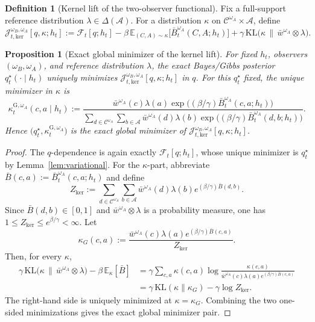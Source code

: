 \documentclass[11pt]{article}
\newtheorem{proposition}[theorem]{Proposition}
\theoremstyle{definition}
\newtheorem{definition}[theorem]{Definition}
\theoremstyle{remark}
\newcommand{\Acal}{\mathcal{A}}
\newcommand{\Ccal}{\mathcal{C}}
\newcommand{\E}{\mathbb{E}}
\newcommand{\KL}{\mathrm{KL}}
\begin{document}
\begin{definition}[Kernel lift of the two-observer functional]
\label{def:kernel-functional}
Fix a full-support reference distribution $\lambda\in\Delta(\Acal)$. For a distribution $\kappa$ on $\Ccal^{\omega_A}\times\Acal$, define
\[
\mathcal J_{t,\mathrm{ker}}^{\omega_B,\omega_A}[q,\kappa;h_t]
:=
\mathcal F_t[q;h_t]
-\beta\,\E_{(C,A)\sim\kappa}\!\bigl[\bar B_t^{\omega_A}(C,A;h_t)\bigr]
+\gamma\,\KL\!\bigl(\kappa\,\|\,\bar w^{\omega_A}\otimes\lambda\bigr).
\]
\end{definition}

\begin{proposition}[Exact global minimizer of the kernel lift]
\label{prop:kernel-functional-minimizer}
For fixed $h_t$, observers $(\omega_B,\omega_A)$, and reference distribution $\lambda$, the exact Bayes/Gibbs posterior $q_t^\star(\cdot\mid h_t)$ uniquely minimizes $\mathcal J_{t,\mathrm{ker}}^{\omega_B,\omega_A}[q,\kappa;h_t]$ in $q$. For this $q_t^\star$ fixed, the unique minimizer in $\kappa$ is
\[
\kappa_t^{\mathrm G,\omega_A}(c,a\mid h_t)
:=
\frac{\bar w^{\omega_A}(c)\lambda(a)\exp\!\bigl((\beta/\gamma)\bar B_t^{\omega_A}(c,a;h_t)\bigr)}
{\sum_{d\in\Ccal^{\omega_A}}\sum_{b\in\Acal}\bar w^{\omega_A}(d)\lambda(b)\exp\!\bigl((\beta/\gamma)\bar B_t^{\omega_A}(d,b;h_t)\bigr)}.
\]
Hence $\bigl(q_t^\star,\kappa_t^{\mathrm G,\omega_A}\bigr)$ is the exact global minimizer of $\mathcal J_{t,\mathrm{ker}}^{\omega_B,\omega_A}[q,\kappa;h_t]$.
\end{proposition}

\begin{proof}
The $q$-dependence is again exactly $\mathcal F_t[q;h_t]$, whose unique minimizer is $q_t^\star$ by Lemma~\ref{lem:variational}. For the $\kappa$-part, abbreviate $\bar B(c,a):=\bar B_t^{\omega_A}(c,a;h_t)$ and define
\[
Z_{\mathrm{ker}}
:=
\sum_{d\in\Ccal^{\omega_A}}\sum_{b\in\Acal}\bar w^{\omega_A}(d)\lambda(b)e^{(\beta/\gamma)\bar B(d,b)}.
\]
Since $\bar B(d,b)\in[0,1]$ and $\bar w^{\omega_A}\otimes\lambda$ is a probability measure, one has $1\le Z_{\mathrm{ker}}\le e^{\beta/\gamma}<\infty$. Let
\[
\kappa_G(c,a):=
\frac{\bar w^{\omega_A}(c)\lambda(a)e^{(\beta/\gamma)\bar B(c,a)}}{Z_{\mathrm{ker}}}.
\]
Then, for every $\kappa$,
\begin{align*}
\gamma\,\KL\!\bigl(\kappa\,\|\,\bar w^{\omega_A}\otimes\lambda\bigr)-\beta\,\E_\kappa[\bar B]
&=\gamma\sum_{c,a}\kappa(c,a)\log\frac{\kappa(c,a)}{\bar w^{\omega_A}(c)\lambda(a)e^{(\beta/\gamma)\bar B(c,a)}}\\
&=\gamma\,\KL(\kappa\|\kappa_G)-\gamma\log Z_{\mathrm{ker}}.
\end{align*}
The right-hand side is uniquely minimized at $\kappa=\kappa_G$. Combining the two one-sided minimizations gives the exact global minimizer pair.
\end{proof}
\end{document}
